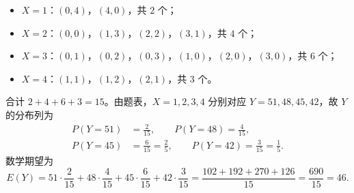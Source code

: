 \begin{answer}
\begin{itemize}
\item $X=1$：$(0,4)$，$(4,0)$，共 $2$ 个；
\item $X=2$：$(0,0)$，$(1,3)$，$(2,2)$，$(3,1)$，共 $4$ 个；
\item $X=3$：$(0,1)$，$(0,2)$，$(0,3)$，$(1,0)$，$(2,0)$，$(3,0)$，共 $6$ 个；
\item $X=4$：$(1,1)$，$(1,2)$，$(2,1)$，共 $3$ 个。
\end{itemize}

合计 $2+4+6+3=15$。由题表，$X=1,2,3,4$ 分别对应 $Y=51,48,45,42$，故 $Y$ 的分布列为
\nopagebreak[4]
\[\begin{aligned}
P(Y=51)&=\frac2{15},\qquad P(Y=48)=\frac4{15},\\
P(Y=45)&=\frac6{15}=\frac25,\qquad P(Y=42)=\frac3{15}=\frac15.
\end{aligned}\]
数学期望为
\nopagebreak[4]
\[E(Y)=51\cdot\frac2{15}+48\cdot\frac4{15}+45\cdot\frac6{15}+42\cdot\frac3{15}
=\frac{102+192+270+126}{15}
=\frac{690}{15}=46.\]



\end{answer}
